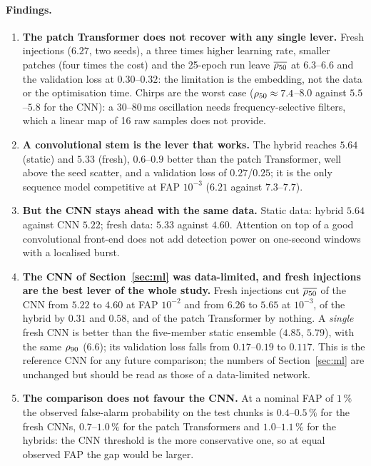 \paragraph{Findings.}
\begin{enumerate}[nosep]
\item \textbf{The patch Transformer does not recover with any single lever.} Fresh injections ($6.27$, two seeds), a three times higher learning rate, smaller patches (four times the cost) and the 25-epoch run leave $\overline{\rho_{50}}$ at $6.3$--$6.6$ and the validation loss at $0.30$--$0.32$: the limitation is the embedding, not the data or the optimisation time. Chirps are the worst case ($\rho_{50}\approx7.4$--$8.0$ against $5.5$--$5.8$ for the CNN): a 30--80\,ms oscillation needs frequency-selective filters, which a linear map of 16 raw samples does not provide.
\item \textbf{A convolutional stem is the lever that works.} The hybrid reaches $5.64$ (static) and $5.33$ (fresh), $0.6$--$0.9$ better than the patch Transformer, well above the seed scatter, and a validation loss of $0.27$/$0.25$; it is the only sequence model competitive at FAP $10^{-3}$ ($6.21$ against $7.3$--$7.7$).
\item \textbf{But the CNN stays ahead with the same data.} Static data: hybrid $5.64$ against CNN $5.22$; fresh data: $5.33$ against $4.60$. Attention on top of a good convolutional front-end does not add detection power on one-second windows with a localised burst.
\item \textbf{The CNN of Section~\ref{sec:ml} was data-limited, and fresh injections are the best lever of the whole study.} Fresh injections cut $\overline{\rho_{50}}$ of the CNN from $5.22$ to $4.60$ at FAP $10^{-2}$ and from $6.26$ to $5.65$ at $10^{-3}$, of the hybrid by $0.31$ and $0.58$, and of the patch Transformer by nothing. A \emph{single} fresh CNN is better than the five-member static ensemble ($4.85$, $5.79$), with the same $\rho_{90}$ ($6.6$); its validation loss falls from $0.17$--$0.19$ to $0.117$. This is the reference CNN for any future comparison; the numbers of Section~\ref{sec:ml} are unchanged but should be read as those of a data-limited network.
\item \textbf{The comparison does not favour the CNN.} At a nominal FAP of $1\,\%$ the observed false-alarm probability on the test chunks is $0.4$--$0.5\,\%$ for the fresh CNNs, $0.7$--$1.0\,\%$ for the patch Transformers and $1.0$--$1.1\,\%$ for the hybrids: the CNN threshold is the more conservative one, so at equal observed FAP the gap would be larger.
\end{enumerate}

